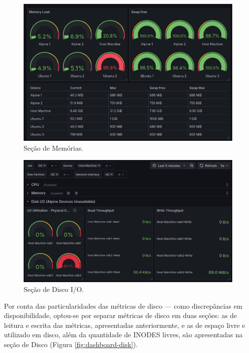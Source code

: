 {\begin{figure}[H]
\centering
\color{red}
\setlength{\abovecaptionskip}{-20pt}
\includegraphics[width=\textwidth]{Imagens/chap04/dashboard/memory.png}
\caption{Seção de Memórias.}
\label{fig:dashboard-memory}
\end{figure}

\vspace{1cm}

\begin{figure}[H]
\centering
\color{red}
\setlength{\abovecaptionskip}{-20pt}
\includegraphics[width=\textwidth]{Imagens/chap04/dashboard/diskio.png}
\caption{Seção de Disco I/O.}
\label{fig:dashboard-diskio}
\end{figure}

Por conta das particularidades das métricas de disco --- como discrepâncias em disponibilidade, optou-se por separar métricas de disco em duas seções: as de leitura e escrita das métricas, apresentadas anteriormente, e as de espaço livre e utilizado em disco, além da quantidade de INODES livres, são apresentadas na seção de Disco (Figura \ref{fig:dashboard-disk}). 

}
